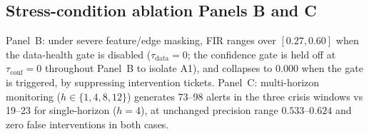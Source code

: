 \subsection{Stress-condition ablation Panels B and C}
\label{app:ablation-stress}

Panel~B: under severe feature/edge masking, FIR ranges over
$[0.27,0.60]$ when the data-health gate is disabled
($\tau_{\mathrm{data}}\!=\!0$; the confidence gate is held off at
$\tau_{\mathrm{conf}}\!=\!0$ throughout Panel~B to isolate A1), and
collapses to $0.000$ when the gate is triggered, by suppressing
intervention tickets.
Panel~C: multi-horizon monitoring ($h\!\in\!\{1,4,8,12\}$) generates
73--98 alerts in the three crisis windows vs 19--23 for
single-horizon ($h\!=\!4$), at unchanged precision range
$0.533$--$0.624$ and zero false interventions in both cases.
